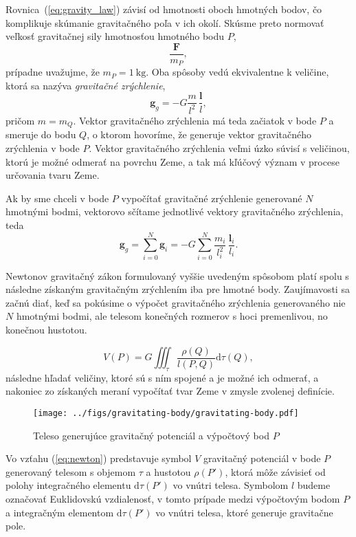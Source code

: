 \documentclass[a4paper, 12pt]{book}
\newcommand{\diff}{\mathrm d}
\let\vec\mathbf
\begin{document}
Rovnica~(\ref{eq:gravity_law}) závisí od hmotnosti oboch hmotných bodov, čo 
komplikuje skúmanie gravitačného poľa v ich okolí.  Skúsme preto normovať 
veľkosť gravitačnej sily hmotnosťou hmotného bodu $P$,
%
\begin{equation}
\frac{\vec F}{m_P}{,}
\end{equation}
%
prípadne uvažujme, že $m_P = 1\ \mathrm{kg}$.  Oba spôsoby vedú ekvivalentne 
k veličine, ktorá sa nazýva \emph{gravitačné zrýchlenie},
%
\begin{equation}
\label{eq:gravitational_vector}
\vec g_g = -G \frac{m}{l^2} \, \frac{\vec l}{l}{,}
\end{equation}
%
pričom $m = m_Q$.  Vektor gravitačného zrýchlenia má teda začiatok v bode $P$ 
a smeruje do bodu $Q$, o ktorom hovoríme, že generuje vektor gravitačného 
zrýchlenia v bode $P$.  Vektor gravitačného zrýchlenia veľmi úzko súvisí 
s veličinou, ktorú je možné odmerať na povrchu Zeme, a tak má kľúčový význam 
v procese určovania tvaru Zeme.

Ak by sme chceli v bode $P$ vypočítať gravitačné zrýchlenie generované $N$ 
hmotnými bodmi, vektorovo sčítame jednotlivé vektory gravitačného zrýchlenia, 
teda
%
\begin{equation}
\vec g_g = \sum_{i = 0}^{N}\vec g_i = -G \sum_{i = 0}^{N} \frac{m_i}{l_i^2} \, 
\frac{\vec l_i}{l_i}{.}
\end{equation}

Newtonov gravitačný zákon formulovaný vyššie uvedeným spôsobom platí spolu 
s následne získaným gravitačným zrýchlením iba pre hmotné body.  Zaujímavosti 
sa začnú diať, keď sa pokúsime o výpočet gravitačného zrýchlenia generovaného 
nie $N$ hmotnými bodmi, ale telesom konečných rozmerov s hoci premenlivou, no 
konečnou hustotou.

%
\begin{equation}
\label{eq:newton}
V(P) = G \iiint_{\tau} \frac{\rho(Q)}{l(P, Q)} \diff \tau(Q){,}
\end{equation}
%
následne hľadať veličiny, ktoré sú s ním spojené a je možné ich odmerať, 
a nakoniec zo získaných meraní vypočítať tvar Zeme v zmysle zvolenej definície.

\begin{figure}[bt]
\centering
\texttt{[image: ../figs/gravitating-body/gravitating-body.pdf]}
\caption{Teleso generujúce gravitačný potenciál a výpočtový bod $P$}
\end{figure}

Vo vzťahu (\ref{eq:newton}) predstavuje symbol $V$ gravitačný potenciál v bode 
$P$ generovaný telesom s objemom $\tau$ a hustotou $\rho(P')$, ktorá môže 
závisieť od polohy integračného elementu $\diff \tau(P')$ vo vnútri telesa.  
Symbolom $l$ budeme označovať Euklidovskú vzdialenosť, v tomto prípade medzi 
výpočtovým bodom $P$ a integračným elementom $\diff \tau(P')$ vo vnútri telesa, 
ktoré generuje gravitačne pole.
\end{document}
